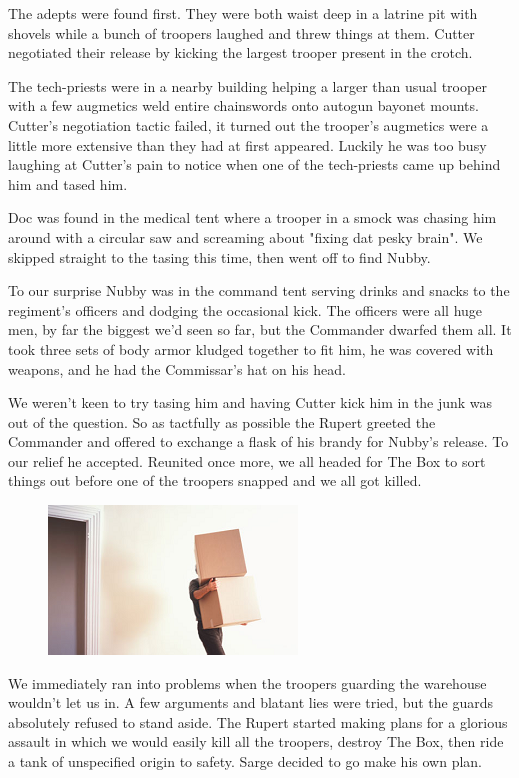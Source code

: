 The adepts were found first. 
They were both waist deep in a latrine pit with shovels while a bunch of troopers laughed and threw things at them. 
Cutter negotiated their release by kicking the largest trooper present in the crotch.

The tech-priests were in a nearby building helping a larger than usual trooper with a few augmetics weld entire chainswords onto autogun bayonet mounts. 
Cutter's negotiation tactic failed, it turned out the trooper's augmetics were a little more extensive than they had at first appeared. 
Luckily he was too busy laughing at Cutter's pain to notice when one of the tech-priests came up behind him and tased him.

Doc was found in the medical tent where a trooper in a smock was chasing him around with a circular saw and screaming about "fixing dat pesky brain". 
We skipped straight to the tasing this time, then went off to find Nubby.

To our surprise Nubby was in the command tent serving drinks and snacks to the regiment's officers and dodging the occasional kick. 
The officers were all huge men, by far the biggest we'd seen so far, but the Commander dwarfed them all. 
It took three sets of body armor kludged together to fit him, he was covered with weapons, and he had the Commissar's hat on his head. 

We weren't keen to try tasing him and having Cutter kick him in the junk was out of the question. 
So as tactfully as possible the Rupert greeted the Commander and offered to exchange a flask of his brandy for Nubby's release. 
To our relief he accepted. 
Reunited once more, we all headed for The Box to sort things out before one of the troopers snapped and we all got killed.

\begin{figure}
	\begin{center}
		\includegraphics[width=\figwidth]{pics/4/25.png}
	\end{center}
\end{figure}
We immediately ran into problems when the troopers guarding the warehouse wouldn't let us in. 
A few arguments and blatant lies were tried, but the guards absolutely refused to stand aside. 
The Rupert started making plans for a glorious assault in which we would easily kill all the troopers, destroy The Box, then ride a tank of unspecified origin to safety. 
Sarge decided to go make his own plan.

